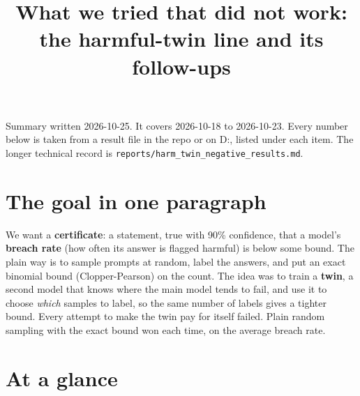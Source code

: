 \documentclass[11pt]{article}
\title{What we tried that did not work: the harmful-twin line and its follow-ups}
\author{}
\date{}
\begin{document}
\maketitle
Summary written 2026-10-25. It covers 2026-10-18 to 2026-10-23. Every number below is taken from a result file in the repo or on D:, listed under each item. The longer technical record is \texttt{reports/\allowbreak harm\_\allowbreak twin\_\allowbreak negative\_\allowbreak results.md}.


\section*{The goal in one paragraph}

We want a \textbf{certificate}: a statement, true with 90\% confidence, that a model's \textbf{breach rate} (how often its answer is flagged harmful) is below some bound. The plain way is to sample prompts at random, label the answers, and put an exact binomial bound (Clopper-Pearson) on the count. The idea was to train a \textbf{twin}, a second model that knows where the main model tends to fail, and use it to choose \emph{which} samples to label, so the same number of labels gives a tighter bound. Every attempt to make the twin pay for itself failed. Plain random sampling with the exact bound won each time, on the average breach rate.


\section*{At a glance}
\end{document}
